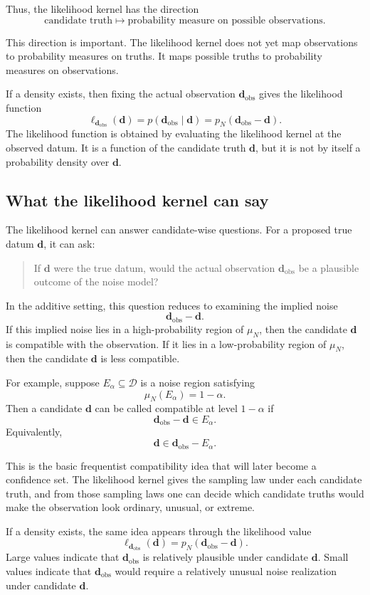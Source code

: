 \documentclass[11pt]{article}
\newcommand{\Dspace}{\mathcal D}
\newcommand{\muN}{\mu_N}
\newcommand{\dobs}{\mathbf d_{\mathrm{obs}}}
\begin{document}
Thus, the likelihood kernel has the direction
\[
    \text{candidate truth}
    \longmapsto
    \text{probability measure on possible observations}.
\]

This direction is important. The likelihood kernel does not yet map observations to probability measures on truths. It maps possible truths to probability measures on observations.

If a density exists, then fixing the actual observation \(\dobs\) gives the likelihood function
\[
    \ell_{\dobs}(\mathbf d)
    =
    p(\dobs\mid \mathbf d)
    =
    p_N(\dobs-\mathbf d).
\]
The likelihood function is obtained by evaluating the likelihood kernel at the observed datum. It is a function of the candidate truth \(\mathbf d\), but it is not by itself a probability density over \(\mathbf d\).

\subsection{What the likelihood kernel can say}

The likelihood kernel can answer candidate-wise questions. For a proposed true datum \(\mathbf d\), it can ask:

\begin{quote}
    If \(\mathbf d\) were the true datum, would the actual observation \(\dobs\) be a plausible outcome of the noise model?
\end{quote}

In the additive setting, this question reduces to examining the implied noise
\[
    \dobs-\mathbf d.
\]
If this implied noise lies in a high-probability region of \(\muN\), then the candidate \(\mathbf d\) is compatible with the observation. If it lies in a low-probability region of \(\muN\), then the candidate \(\mathbf d\) is less compatible.

For example, suppose \(E_{\alpha}\subseteq\Dspace\) is a noise region satisfying
\[
    \muN(E_{\alpha})=1-\alpha.
\]
Then a candidate \(\mathbf d\) can be called compatible at level \(1-\alpha\) if
\[
    \dobs-\mathbf d\in E_{\alpha}.
\]
Equivalently,
\[
    \mathbf d\in \dobs-E_{\alpha}.
\]

This is the basic frequentist compatibility idea that will later become a confidence set. The likelihood kernel gives the sampling law under each candidate truth, and from those sampling laws one can decide which candidate truths would make the observation look ordinary, unusual, or extreme.

If a density exists, the same idea appears through the likelihood value
\[
    \ell_{\dobs}(\mathbf d)
    =
    p_N(\dobs-\mathbf d).
\]
Large values indicate that \(\dobs\) is relatively plausible under candidate \(\mathbf d\). Small values indicate that \(\dobs\) would require a relatively unusual noise realization under candidate \(\mathbf d\).
\end{document}
